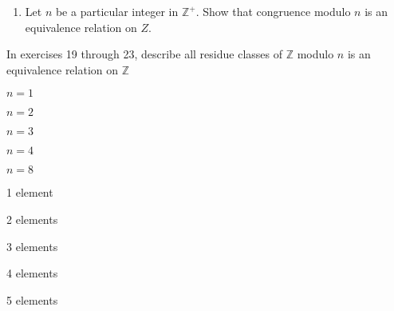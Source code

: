 \documentclass[10pt,letterpaper]{article}
\begin{document}
  \begin{enumerate}[resume]
    \item Let $n$ be a particular integer in $\mathbb{Z}^+$. Show that congruence modulo $n$ is an equivalence relation on ${Z}$.
  \end{enumerate}

  In exercises 19 through 23, describe all residue classes of $\mathbb{Z}$ modulo $n$ is an equivalence relation on $\mathbb{Z}$

  \begin{enumerate*}[resume]
    \setcounter{enumi}{18}
    \item $n = 1$
    \item $n = 2$
    \item $n = 3$
    \item $n = 4$
    \item $n = 8$
  \end{enumerate*}

  \begin{enumerate*}[resume]
    \item 1 element
    \item 2 elements
    \item 3 elements
    \item 4 elements
    \item 5 elements
  \end{enumerate*}
\end{document}

